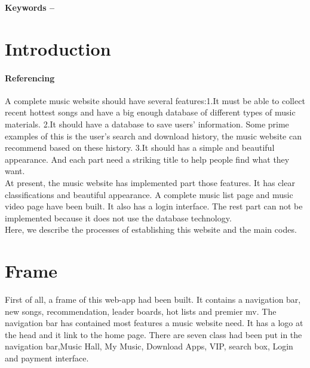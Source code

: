 \documentclass[10pt, a4paper]{article}
\title{\mytitle}
\author{\myauthor\hspace{1em}\\\contact\\Edinburgh Napier University\hspace{0.5em}-\hspace{0.5em}\mymodule}
\date{}
\begin{document}
	\maketitle
	\begin{abstract}
	   In order to test to test the proficiency in the use of python, html, css and javascript. A music website was planned to be established. This report will introduce frame of this website at first. Then it will describe the codes of each interface which compose this website. Finally, this report will sum up problems the web-app has and the solutions.
	\end{abstract}
    
	\textbf{Keywords -- }{\mykeywords}

	\section{Introduction}
    \paragraph{Referencing}
     A complete music website should have several features:1.It must be able to collect recent hottest songs and have a big enough database of different types of music materials. 2.It should have a database to save users' information. Some prime examples of this is the user's search and download history, the music website can recommend based on these history. 3.It should has a simple and beautiful appearance. And each part need a striking title to help people find what they want. \\ 
	 At present, the music website has implemented part those features. It has clear classifications and beautiful appearance. A complete music list page and music video page have been built. It also has a login interface. The rest part can not be implemented because it does not use the database technology. \\ Here, we describe the processes of establishing this website and the main codes.
    
    
	
	\section{Frame}
	First of all, a frame of this web-app had been built. It contains a navigation bar, new songs, recommendation, leader boards, hot lists and premier mv. The navigation bar has contained most features a music website need. It has a logo at the head and it link to the home page. There are seven class had been put in the navigation bar,Music Hall, My Music, Download Apps, VIP, search box, Login and payment interface. 
	
\end{document}
